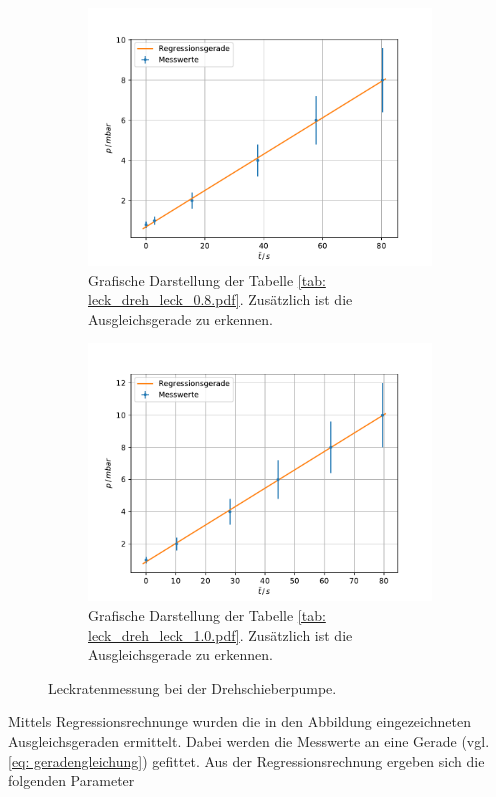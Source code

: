 \begin{figure}
    \centering
    \begin{subfigure}{0.4\textwidth}
        \centering
        \includegraphics[width=1\textwidth]{../Messdaten/plots/dreh/leckrate_dreh_08.pdf}
        \caption{Grafische Darstellung der Tabelle \ref{tab: leck_dreh_leck_0.8.pdf}. Zusätzlich ist die Ausgleichsgerade zu erkennen.}
        \label{fig: drehs_leck_1}
    \end{subfigure}
    \begin{subfigure}{0.4\textwidth}
        \centering
        \includegraphics[width=1\textwidth]{../Messdaten/plots/dreh/leckrate_dreh_10.pdf}
        \caption{Grafische Darstellung der Tabelle \ref{tab: leck_dreh_leck_1.0.pdf}. Zusätzlich ist die Ausgleichsgerade zu erkennen.}
    \end{subfigure}
    \caption{Leckratenmessung bei der Drehschieberpumpe.}
      \label{fig: leck_dreh_2}
\end{figure}
Mittels Regressionsrechnunge wurden die in den Abbildung eingezeichneten Ausgleichsgeraden ermittelt.
Dabei werden die Messwerte an eine Gerade (vgl. \eqref{eq: geradengleichung}) gefittet.
Aus der Regressionsrechnung ergeben sich die folgenden Parameter

